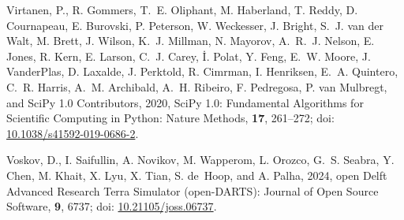 \documentclass[a4paper, colorlinks=false, 11pt, parskip=half,
               notitlepage, oneside, fleqn, pdftex]{scrartcl}
\begin{document}
\begin{thebibliography}{}
Virtanen, P., R. Gommers, T.~E. Oliphant, M. Haberland, T. Reddy, D.
  Cournapeau, E. Burovski, P. Peterson, W. Weckesser, J. Bright, S.~J. {van der
  Walt}, M. Brett, J. Wilson, K.~J. Millman, N. Mayorov, A.~R.~J. Nelson, E.
  Jones, R. Kern, E. Larson, C.~J. Carey, {\.I}. Polat, Y. Feng, E.~W. Moore,
  J. {VanderPlas}, D. Laxalde, J. Perktold, R. Cimrman, I. Henriksen, E.~A.
  Quintero, C.~R. Harris, A.~M. Archibald, A.~H. Ribeiro, F. Pedregosa, P. {van
  Mulbregt}, and {SciPy 1.0 Contributors},  2020, {{SciPy} 1.0: Fundamental
  Algorithms for Scientific Computing in Python}: Nature Methods, {\bfseries
  17}, 261--272; doi:
  \href{https://doi.org/10.1038/s41592-019-0686-2}{10.1038/s41592-019-0686-2}.

Voskov, D., I. Saifullin, A. Novikov, M. Wapperom, L. Orozco, G.~S. Seabra, Y.
  Chen, M. Khait, X. Lyu, X. Tian, S. de~Hoop, and A. Palha,  2024, open
  {D}elft {A}dvanced {R}esearch {T}erra {S}imulator (open-{DARTS}): Journal of
  Open Source Software, {\bfseries 9}, 6737; doi:
  \href{https://doi.org/10.21105/joss.06737}{10.21105/joss.06737}.

\end{thebibliography}
\end{document}
